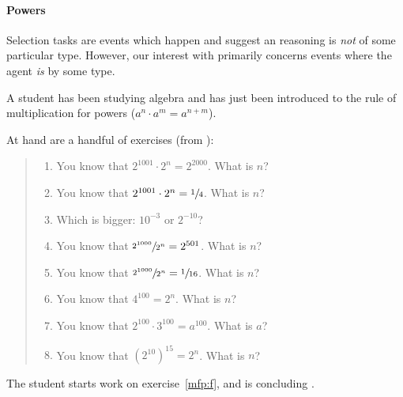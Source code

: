 \paragraph*{Powers}

\begin{note}
  Selection tasks are events which happen and suggest an \agents{} reasoning is \emph{not} of some particular type.
  However, our interest with \tCN{} primarily concerns events where the agent \emph{is} \tCV{} by some type.
\end{note}

\begin{note}
  \begin{scenario}%
    \label{illu:tR:powers}%
    A student has been studying algebra and has just been introduced to the rule of multiplication for powers (\(a^{n} \cdot a^{m} = a^{n + m}\)).

    At hand are a handful of exercises (from \cite[32]{Gelfand:1993aa}):
    \begin{quote}
      \begin{enumerate}[label=(\alph*), ref=(\alph*)]
      \item
        \label{mfp:a}
        You know that \(2^{1001} \cdot 2^{n} = 2^{2000}\).
        What is \(n\)?
      \item
        \label{mfp:b}
        You know that \(2^{1001} \cdot 2^{n} = \sfrac{1}{4}\).
        What is \(n\)?
      \item
        \label{mfp:c}
        Which is bigger: \(10^{-3}\) or \(2^{-10}\)?
      \item
        \label{mfp:d}
        You know that \(\sfrac{2^{1000}}{2^{n}} = 2^{501}\).
        What is \(n\)?
      \item
        \label{mfp:e}
        You know that \(\sfrac{2^{1000}}{2^{n}} = \sfrac{1}{16}\).
        What is \(n\)?
      \item
        \label{mfp:f}
        You know that \(4^{100} = 2^{n}\).
        What is \(n\)?
      \item
        \label{mfp:g}
        You know that \(2^{100} \cdot 3^{100} = a^{100}\).
        What is \(a\)?
      \item
        \label{mfp:h}
        You know that \((2^{10})^{15} = 2^{n}\).
        What is \(n\)?
      \end{enumerate}
    \end{quote}
    The student starts work on exercise~\ref{mfp:f}, and is concluding .
  \end{scenario}


\end{note}
